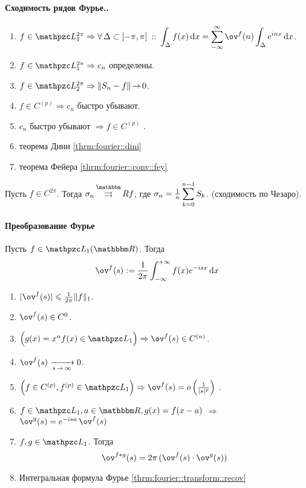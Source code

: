 \documentclass[12pt,draft,timbord]{longnotes}
\begin{document}
\paragraph{Сходимость рядов Фурье..}
\label{par:fourier::conv}

\begin{enumerate}[$1^\circ$]
  \item $f\in \summb_1^{2\pi} \Rightarrow 
    \forall\, \Delta \subset [-\pi,\pi] \holds 
    \dint_\Delta f(x) \, \del x = \sum_{-\infty}^\infty \ov^{f} (n) \int_\Delta e^{inx}\, \del x$.
  \item $f\in \summb_1^{2\pi} \Rightarrow c_n$ определены.
  \item $f\in \summb_2^{2\pi} \Rightarrow \|S_n - f\| \to 0$.
  \item $f\in C^{(p)} \Rightarrow c_n$ быстро убывают.
  \item $c_n$ быстро убывают $\Rightarrow f\in C^{(p)}$ .
  \item теорема Дини \ref{thrm:fourier::dini}
  \item теорема Фейера \ref{thrm:fourier::conv::fey}
\end{enumerate}

\begin{thrm}[Фейера]\label{thrm:fourier::conv::fey}
  Пусть $f\in C^{2\pi}$. Тогда $ \sigma_n \unito^\R f$, 
  где $\sigma_n = \frac{1}{n} \displaystyle\sum_{k=0}^{n-1} S_k$. (сходимость по Чезаро).
\end{thrm}

\paragraph{Преобразование Фурье}
\label{par:fourier::transform}

\begin{defn}\label{defn:fourier::transform}
  Пусть $f \in \summb_1 (\R)$. Тогда\[
    \ov^{f} (s) := \frac{1}{2\pi}  \intR f(x) e^{-isx} \, \del x
  \]
\end{defn}

\begin{enumerate}
  \item $|\ov^{f} (s) | \leqslant \frac{1}{2\pi} \|f\|_1$.
  \item $\ov^{f}(s) \in C^0 $.
  \item $\Bigl(g(x) = x^n f(x) \in \summb_1 \Bigr)\Rightarrow \ov^{f}(s) \in C^{(n)} $.
  \item $\ov^f(s) \xto{s \to \infty} 0 $.
  \item $\Bigl( f\in C^{(p)},f^{(p)}\in \summb_1\Bigr)
    \Rightarrow\ov^f(s) = o\left(\frac{1}{|s|^p}\right)$ .
  \item $f\in \summb_1, a\in \R, g(x) = f(x-a)$ $ \Rightarrow $ $\ov^g(s) = e^{-isa}\,\ov^f(s)$
  \item $f, g\in \summb_1$. Тогда \[
      \ov^{f\ast g} (s) = 2 \pi \,(\ov^f(s) \cdot \ov^g(s))
    \]
  \item Интегральная формула Фурье \ref{thrm:fourier::transform::recov}
\end{enumerate}
\end{document}
